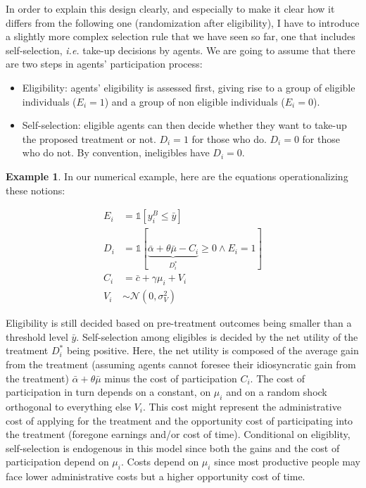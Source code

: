 \documentclass[
]{book}
\providecommand{\tightlist}{%
  \setlength{\itemsep}{0pt}\setlength{\parskip}{0pt}}
\newcommand{\uns}[1]{\mathds{1}[ #1 ]}
\theoremstyle{definition}
\theoremstyle{definition}
\newtheorem{example}{Example}[chapter]
\theoremstyle{definition}
\theoremstyle{definition}
\theoremstyle{remark}
\begin{document}
In order to explain this design clearly, and especially to make it clear how it differs from the following one (randomization after eligibility), I have to introduce a slightly more complex selection rule that we have seen so far, one that includes self-selection, \textit{i.e.} take-up decisions by agents.
We are going to assume that there are two steps in agents' participation process:

\begin{itemize}
\tightlist
\item
  Eligibility: agents' eligibility is assessed first, giving rise to a group of eligible individuals (\(E_i=1\)) and a group of non eligible individuals (\(E_i=0\)).
\item
  Self-selection: eligible agents can then decide whether they want to take-up the proposed treatment or not.
  \(D_i=1\) for those who do.
  \(D_i=0\) for those who do not.
  By convention, ineligibles have \(D_i=0\).
\end{itemize}

\begin{example}
\protect\hypertarget{exm:unnamed-chunk-78}{}{\label{exm:unnamed-chunk-78} }In our numerical example, here are the equations operationalizing these notions:
\end{example}
\begin{align*}
E_i & = \uns{y_i^B\leq\bar{y}} \\
D_i & = \uns{\underbrace{\bar{\alpha}+\theta\bar{\mu}-C_i}_{D_i^*}\geq0 \land E_i=1} \\
C_i & = \bar{c} + \gamma \mu_i + V_i\\
V_i & \sim \mathcal{N}(0,\sigma^2_V)
\end{align*}

Eligibility is still decided based on pre-treatment outcomes being smaller than a threshold level \(\bar{y}\).
Self-selection among eligibles is decided by the net utility of the treatment \(D_i^*\) being positive.
Here, the net utility is composed of the average gain from the treatment (assuming agents cannot foresee their idiosyncratic gain from the treatment) \(\bar{\alpha}+\theta\bar{\mu}\) minus the cost of participation \(C_i\).
The cost of participation in turn depends on a constant, on \(\mu_i\) and on a random shock orthogonal to everything else \(V_i\).
This cost might represent the administrative cost of applying for the treatment and the opportunity cost of participating into the treatment (foregone earnings and/or cost of time).
Conditional on eligiblity, self-selection is endogenous in this model since both the gains and the cost of participation depend on \(\mu_i\).
Costs depend on \(\mu_i\) since most productive people may face lower administrative costs but a higher opportunity cost of time.
\end{document}
